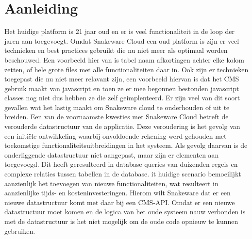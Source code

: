 \section{Aanleiding} 
Het huidige platform is 21 jaar oud en er is veel functionaliteit in de loop der jaren aan toegevoegt.
Omdat Snakeware Cloud een oud platform is zijn er veel technieken en best practices gebruikt die nu niet meer als optimaal worden beschouwed.
Een voorbeeld hier van is tabel naam afkortingen achter elke kolom zetten, of hele grote files met alle functionaliteiten daar in. 
Ook zijn er technieken toegepast die nu niet meer relavant zijn, een voorbeeld hiervan is dat het \gls{CMS} gebruik maakt van javascript en toen ze er mee begonnen bestonden javascript classes nog niet dus hebben ze die zelf geimplenteerd.
Er zijn veel van dit soort gevallen wat het lastig maakt om Snakeware cloud te onderhouden of uit te breiden.
\whitespace
Een van de voornaamste kwesties met Snakeware Cloud betreft de verouderde datastructuur van de applicatie.
Deze veroudering is het gevolg van een initiële ontwikkeling waarbij onvoldoende rekening werd gehouden met toekomstige functionaliteitsuitbreidingen in het systeem.
Als gevolg daarvan is de onderliggende datastructuur niet aangepast, maar zijn er elementen aan toegevoegd.
Dit heeft geresulteerd in database queries van duizenden regels en complexe relaties tussen tabellen in de database.
it huidige scenario bemoeilijkt aanzienlijk het toevoegen van nieuwe functionaliteiten, wat resulteert in aanzienlijke tijds- en kosteninvesteringen.
\whitespace
Hierom wilt Snakeware dat er een nieuwe datastructuur komt met daar bij een \gls{CMS}-API.
Omdat er een nieuwe datastructuur moet komen en de logica van het oude systeem nauw verbonden is met de
datastructuur is het niet mogelijk om de oude code opnieuw te kunnen gebruiken.
